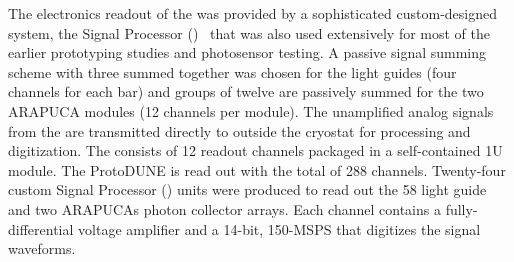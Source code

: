 
The electronics readout of the   was provided by a sophisticated custom-designed system, the  Signal Processor ()~ that was also used extensively for most of the earlier prototyping studies and photosensor testing.
A passive signal summing scheme with three  summed together was chosen for the light guides (four  channels for each bar) and groups of twelve  are passively summed for the two ARAPUCA modules (12  channels per module).
The unamplified analog signals from the  are transmitted directly to outside the cryostat for processing and digitization. The  consists of 12 readout channels packaged in 
a self-contained 1U module. The ProtoDUNE  is read out with the total of 288  channels. 
Twenty-four custom  Signal Processor () units were produced to read out the 58 light guide and two ARAPUCAs photon collector arrays.
Each channel contains a fully-differential voltage amplifier and a \num{14}-bit, \num{150}-MSPS  that digitizes the  signal waveforms.


